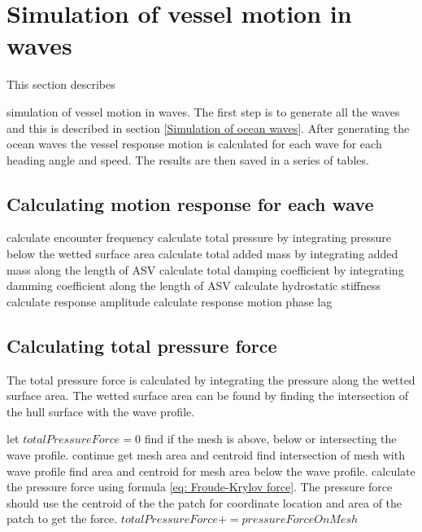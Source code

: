 \section{Simulation of vessel motion in waves} 
\label{Simulation of vessel motion in waves}

This section describes{ simulation of vessel motion in waves. The first step is
to generate all the waves and this is described in section \ref{Simulation of
ocean waves}. After generating the ocean waves the vessel response motion is
calculated for each wave for each heading angle and speed. The results are then
saved in a series of tables. 

\subsection{Calculating motion response for each wave}
\label{Calculating motion response for each wave}

\begin{algorithmic}
        \STATE calculate encounter frequency 
        \STATE calculate total pressure by integrating pressure below the wetted
        surface area 
        \STATE calculate total added mass by integrating added mass along the
        length of ASV 
        \STATE calculate total damping coefficient by integrating damming 
        coefficient along the length of ASV 
        \STATE calculate hydrostatic stiffness 
        \STATE calculate response amplitude 
        \STATE calculate response motion phase lag
      \ENDFOR
    \ENDFOR
  \ENDFOR
\end{algorithmic}

\subsection{Calculating total pressure force}
\label{Calculating total pressure force}
The total pressure force is calculated by integrating the pressure along the
wetted surface area. The wetted surface area can be found by finding the
intersection of the hull surface with the wave profile. 

\begin{algorithmic}
  \STATE let $totalPressureForce = 0$ 
    \STATE find if the mesh is above, below or intersecting the wave profile.
      \STATE continue
      \STATE get mesh area and centroid 
    \ELSE
      \STATE find intersection of mesh with wave profile
      \STATE find area and centroid for mesh area below the wave profile.
    \ENDIF
    \STATE calculate the pressure force using formula \ref{eq: Froude-Krylov 
    force}. The pressure force should use the centroid of the the patch for 
    coordinate location and area of the patch to get the force.
    \STATE $totalPressureForce += pressureForceOnMesh $ 
  \ENDFOR
\end{algorithmic}

}

